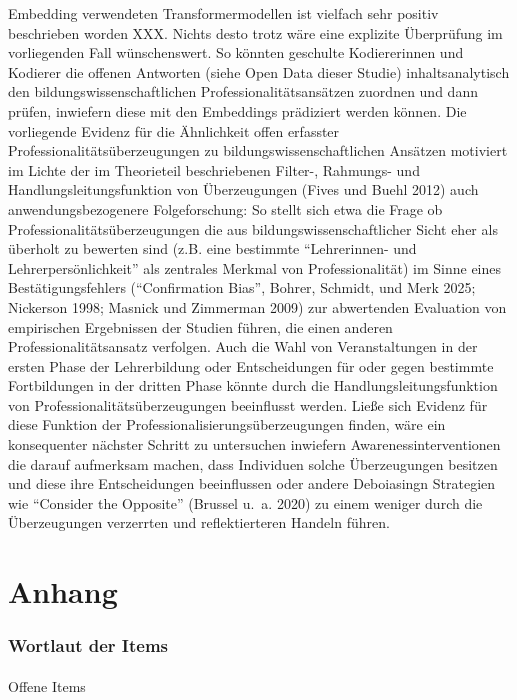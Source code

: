 \documentclass[
  letterpaper,
  DIV=11]{scrartcl}
\makeatletter
\let\oldparagraph\paragraph
\renewcommand{\paragraph}{
    \@ifstar
      \xxxParagraphStar
      \xxxParagraphNoStar
  }
\newcommand{\xxxParagraphStar}[1]{\oldparagraph*{#1}\mbox{}}
\newcommand{\xxxParagraphNoStar}[1]{\oldparagraph{#1}\mbox{}}
\makeatother
\begin{document}
Embedding verwendeten Transformermodellen ist vielfach sehr positiv
beschrieben worden XXX. Nichts desto trotz wäre eine explizite
Überprüfung im vorliegenden Fall wünschenswert. So könnten geschulte
Kodiererinnen und Kodierer die offenen Antworten (siehe Open Data dieser
Studie) inhaltsanalytisch den bildungswissenschaftlichen
Professionalitätsansätzen zuordnen und dann prüfen, inwiefern diese mit
den Embeddings prädiziert werden können. Die vorliegende Evidenz für die
Ähnlichkeit offen erfasster Professionalitätsüberzeugungen zu
bildungswissenschaftlichen Ansätzen motiviert im Lichte der im
Theorieteil beschriebenen Filter-, Rahmungs- und
Handlungsleitungsfunktion von Überzeugungen (Fives und Buehl 2012) auch
anwendungsbezogenere Folgeforschung: So stellt sich etwa die Frage ob
Professionalitätsüberzeugungen die aus bildungswissenschaftlicher Sicht
eher als überholt zu bewerten sind (z.B. eine bestimmte ``Lehrerinnen-
und Lehrerpersönlichkeit'' als zentrales Merkmal von Professionalität)
im Sinne eines Bestätigungsfehlers (``Confirmation Bias'', Bohrer,
Schmidt, und Merk 2025; Nickerson 1998; Masnick und Zimmerman 2009) zur
abwertenden Evaluation von empirischen Ergebnissen der Studien führen,
die einen anderen Professionalitätsansatz verfolgen. Auch die Wahl von
Veranstaltungen in der ersten Phase der Lehrerbildung oder
Entscheidungen für oder gegen bestimmte Fortbildungen in der dritten
Phase könnte durch die Handlungsleitungsfunktion von
Professionalitätsüberzeugungen beeinflusst werden. Ließe sich Evidenz
für diese Funktion der Professionalisierungsüberzeugungen finden, wäre
ein konsequenter nächster Schritt zu untersuchen inwiefern
Awarenessinterventionen die darauf aufmerksam machen, dass Individuen
solche Überzeugungen besitzen und diese ihre Entscheidungen beeinflussen
oder andere Deboiasingn Strategien wie ``Consider the Opposite''
(Brussel u.~a. 2020) zu einem weniger durch die Überzeugungen verzerrten
und reflektierteren Handeln führen.

\section{Anhang}\label{anhang}

\subsubsection{Wortlaut der Items}\label{sec-wortlaut-der-items}

\paragraph{Offene Items}\label{offene-items}
\end{document}
